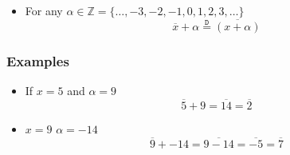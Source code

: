 \documentclass[preview]{standalone}
\begin{document}
\begin{center}
\begin{itemize}
              \item For any $\alpha \in \mathbb{Z} = \{ \dots, -3, -2, -1, 0, 1, 2, 3, \dots\}$
                \[
                \overline{x}  +  \alpha \stackrel{\mathtt{D}}{=} \overline{\left( x  +  \alpha \right)}
                \]
            \end{itemize}
            \subsubsection*{Examples}
            \begin{itemize}
              \item If $x = 5$ and $\alpha = 9$
                \[
                \overline{5}  +  9 = \overline{14} = \overline{2}
                \] 
              \item $x = 9$ $\alpha = -14$ 
                \[
                \overline{9}  +   - 14 = \overline{9  -  14} = \overline{  - 5} = \overline{7}
                \]
            \end{itemize}
\end{center}
\end{document}
